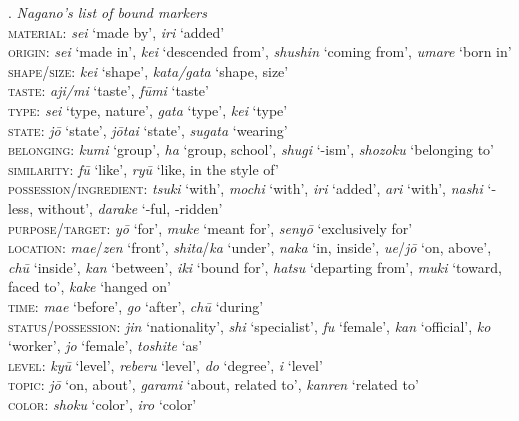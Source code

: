 \ex. \emph{Nagano's list of bound markers}\\
\textsc{material}: \textit{sei} ‘made by’, \textit{iri} ‘added’\\
\textsc{origin}: \textit{sei} ‘made in’, \textit{kei} ‘descended from’, \textit{shushin} ‘coming from’, \textit{umare} ‘born in’\\
\textsc{shape}/\textsc{size}: \textit{kei} ‘shape’, \textit{kata/gata} ‘shape, size’\\
\textsc{taste}: \textit{aji/mi} ‘taste’, \textit{fūmi} ‘taste’\\
\textsc{type}: \textit{sei} ‘type, nature’, \textit{gata} ‘type’, \textit{kei} ‘type’\\
\textsc{state}: \textit{jō} ‘state’, \textit{jōtai} ‘state’, \textit{sugata} ‘wearing’\\
\textsc{belonging}: \textit{kumi} ‘group’, \textit{ha} ‘group, school’, \textit{shugi} ‘-ism’, \textit{shozoku} ‘belonging to’\\
\textsc{similarity}: \textit{fū} ‘like’, \textit{ryū} ‘like, in the style of’\\
\textsc{possession}/\textsc{ingredient}: \textit{tsuki} ‘with’, \textit{mochi} ‘with’, \textit{iri} ‘added’, \textit{ari} ‘with’, \textit{nashi} ‘-less, without’, \textit{darake} ‘-ful, -ridden’\\
\textsc{purpose}/\textsc{target}: \textit{yō} ‘for’, \textit{muke} ‘meant for’, \textit{senyō} ‘exclusively for’\\
\textsc{location}: \textit{mae}/\textit{zen} ‘front’, \textit{shita}/\textit{ka} ‘under’, \textit{naka} ‘in, inside’, \textit{ue}/\textit{jō} ‘on, above’, \textit{chū} ‘inside’, \textit{kan} ‘between’, \textit{iki} ‘bound for’, \textit{hatsu} ‘departing from’, \textit{muki} ‘toward, faced to’, \textit{kake} ‘hanged on’\\
\textsc{time}: \textit{mae} ‘before’, \textit{go} ‘after’, \textit{chū} ‘during’\\
\textsc{status}/\textsc{possession}: \textit{jin} ‘nationality’, \textit{shi} ‘specialist’, \textit{fu} ‘female’, \textit{kan} ‘official’, \textit{ko} ‘worker’, \textit{jo} ‘female’, \textit{toshite} ‘as’\\
\textsc{level}: \textit{kyū} ‘level’, \textit{reberu} ‘level’, \textit{do} ‘degree’, \textit{i} ‘level’\\
\textsc{topic}: \textit{jō} ‘on, about’, \textit{garami} ‘about, related to’, \textit{kanren} ‘related to’\\
\textsc{color}: \textit{shoku} ‘color’, \textit{iro} ‘color’

